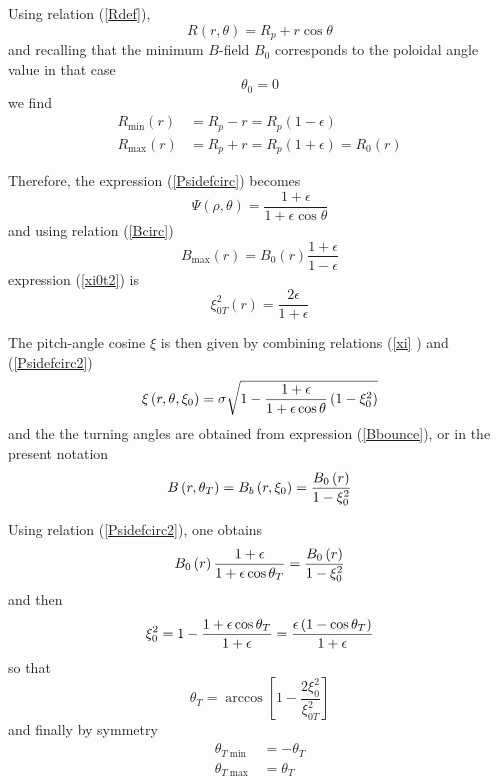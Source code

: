 Using relation (\ref{Rdef}),
\begin{equation}
R\left( r,\theta \right) =R_{p}+r\cos \theta   \label{MajorradiusCirc}
\end{equation}
and recalling that the minimum $B$-field $B_{0}$ corresponds to the poloidal
angle value in that case
\begin{equation}
\theta _{0}=0
\end{equation}
we find
\begin{align}
R_{\min }\left( r\right) & =R_{p}-r=R_{p}\left( 1-\epsilon \right)  \\
R_{\max }\left( r\right) & =R_{p}+r=R_{p}\left( 1+\epsilon \right)
=R_{0}\left( r\right)
\end{align}

Therefore, the expression (\ref{Psidefcirc}) becomes
\begin{equation}
\Psi \left( \rho ,\theta \right) =\frac{1+\epsilon }{1+\epsilon \cos \theta }
\label{Psidefcirc2}
\end{equation}
and using relation (\ref{Bcirc})
\begin{equation}
B_{\max }\left( r\right) =B_{0}\left( r\right) \frac{1+\epsilon }{1-\epsilon
}
\end{equation}
expression (\ref{xi0t2}) is
\begin{equation}
\xi _{0T}^{2}\left( r\right) =\frac{2\epsilon }{1+\epsilon }
\end{equation}

The pitch-angle cosine $\xi $ is then given by combining relations (\ref{xi}
) and (\ref{Psidefcirc2})
\begin{equation}
\xi \left( r,\theta ,\xi _{0}\right) =\sigma \sqrt{1-\frac{1+\epsilon }{%
1+\epsilon \cos \theta }\left( 1-\xi _{0}^{2}\right) }  \label{xicirc}
\end{equation}
and the the turning angles are obtained from expression (\ref{Bbounce}), or
in the present notation
\begin{equation}
B\left( r,\theta _{T}\right) =B_{b}\left( r,\xi _{0}\right) =\frac{%
B_{0}\left( r\right) }{1-\xi _{0}^{2}}
\end{equation}

Using relation (\ref{Psidefcirc2}), one obtains
\begin{equation}
B_{0}\left( r\right) \frac{1+\epsilon }{1+\epsilon \cos \theta _{T}}=\frac{%
B_{0}\left( r\right) }{1-\xi _{0}^{2}}
\end{equation}
and then
\begin{equation}
\xi _{0}^{2}=1-\frac{1+\epsilon \cos \theta _{T}}{1+\epsilon }=\frac{%
\epsilon \left( 1-\cos \theta _{T}\right) }{1+\epsilon }
\end{equation}
so that
\begin{equation}
\theta _{T}=\arccos \left[ 1-\frac{2\xi _{0}^{2}}{\xi _{0T}^{2}}\right]
\end{equation}
and finally by symmetry
\begin{align}
\theta _{T\min }& =-\theta _{T} \\
\theta _{T\max }& =\theta _{T}  \nonumber
\end{align}

